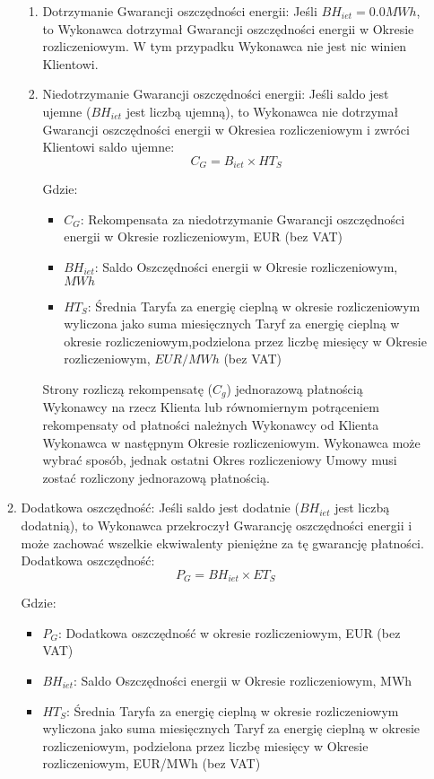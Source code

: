 \begin{enumerate}
\begin{enumerate}
\vspace{1cm}
		\begin{enumerate}
			\item Dotrzymanie Gwarancji oszczędności energii: Jeśli $BH_{iet}=0.0 MWh$, to Wykonawca dotrzymał Gwarancji oszczędności energii w Okresie rozliczeniowym. W tym przypadku Wykonawca nie jest nic winien Klientowi.

			\item Niedotrzymanie Gwarancji oszczędności energii: Jeśli saldo jest ujemne ($BH_{iet}$ jest liczbą ujemną), to Wykonawca nie dotrzymał Gwarancji oszczędności energii w Okresiea rozliczeniowym i zwróci Klientowi saldo ujemne:
\[ C_G = B_{iet} \times HT_S \]

Gdzie:

\begin{itemize}
	\item $C_G$: Rekompensata za niedotrzymanie Gwarancji oszczędności energii w Okresie rozliczeniowym, EUR (bez VAT)
	\item $BH_{iet}$: Saldo Oszczędności energii w Okresie rozliczeniowym, $MWh$
	\item $HT_S$: Średnia Taryfa za energię cieplną w okresie rozliczeniowym wyliczona jako suma miesięcznych Taryf za energię cieplną w okresie rozliczeniowym,podzielona przez liczbę miesięcy w Okresie rozliczeniowym, $EUR/MWh$ (bez VAT)
\end{itemize}

Strony rozliczą rekompensatę ($C_g$) jednorazową płatnością Wykonawcy na rzecz Klienta lub równomiernym potrąceniem rekompensaty od płatności należnych Wykonawcy od Klienta Wykonawca w następnym Okresie rozliczeniowym. Wykonawca może wybrać sposób, jednak ostatni Okres rozliczeniowy Umowy musi zostać rozliczony jednorazową płatnością.
	\end{enumerate}

		\item Dodatkowa oszczędność: Jeśli saldo jest dodatnie ($BH_{iet}$  jest liczbą dodatnią), to Wykonawca przekroczył Gwarancję oszczędności energii i może zachować wszelkie ekwiwalenty pieniężne za tę gwarancję płatności. Dodatkowa oszczędność:
\[ P_G = BH_{iet} \times ET_S \]

Gdzie:

\begin{itemize}
	\item $P_G$: Dodatkowa oszczędność w okresie rozliczeniowym, EUR (bez VAT)
	\item $BH_{iet}$: Saldo Oszczędności energii w Okresie rozliczeniowym, MWh
	\item $HT_S$: Średnia Taryfa za energię cieplną w okresie rozliczeniowym wyliczona jako suma miesięcznych Taryf za energię cieplną w okresie rozliczeniowym, podzielona przez liczbę miesięcy w Okresie rozliczeniowym, EUR/MWh (bez VAT)
\end{itemize}


\end{enumerate}
\end{enumerate}
